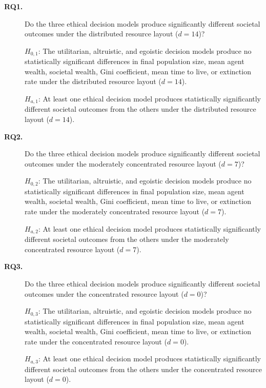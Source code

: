 \documentclass{icsthesis}
\begin{document}
\begin{mainmatter}
\begin{description}

    \item[\textbf{RQ1.}] Do the three ethical decision models produce significantly different societal outcomes under the distributed resource layout ($d = 14$)?

    \smallskip
    \noindent $H_{0,1}$: The utilitarian, altruistic, and egoistic decision models produce no statistically significant differences in final population size, mean agent wealth, societal wealth, Gini coefficient, mean time to live, or extinction rate under the distributed resource layout ($d = 14$).

    \smallskip
    \noindent $H_{a,1}$: At least one ethical decision model produces statistically significantly different societal outcomes from the others under the distributed resource layout ($d = 14$).

    \bigskip
    \item[\textbf{RQ2.}] Do the three ethical decision models produce significantly different societal outcomes under the moderately concentrated resource layout ($d = 7$)?

    \smallskip
    \noindent $H_{0,2}$: The utilitarian, altruistic, and egoistic decision models produce no statistically significant differences in final population size, mean agent wealth, societal wealth, Gini coefficient, mean time to live, or extinction rate under the moderately concentrated resource layout ($d = 7$).

    \smallskip
    \noindent $H_{a,2}$: At least one ethical decision model produces statistically significantly different societal outcomes from the others under the moderately concentrated resource layout ($d = 7$).

    \bigskip
    \item[\textbf{RQ3.}] Do the three ethical decision models produce significantly different societal outcomes under the concentrated resource layout ($d = 0$)?

    \smallskip
    \noindent $H_{0,3}$: The utilitarian, altruistic, and egoistic decision models produce no statistically significant differences in final population size, mean agent wealth, societal wealth, Gini coefficient, mean time to live, or extinction rate under the concentrated resource layout ($d = 0$).

    \smallskip
    \noindent $H_{a,3}$: At least one ethical decision model produces statistically significantly different societal outcomes from the others under the concentrated resource layout ($d = 0$).


\end{description}
\end{mainmatter}
\end{document}

